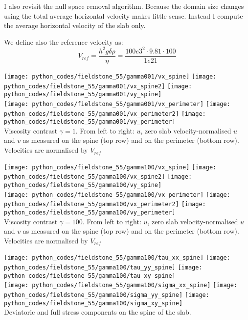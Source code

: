 I also revisit the null space removal algorithm. Because the domain size changes 
using the total average horizontal velocity makes little sense. Instead 
I compute the average horizontal velocity of the slab only. 

We define also the reference velocity as:
\[
V_{ref}= \frac{h^2 g \delta \rho }{\eta} = \frac{100e3^2 \cdot 9.81 \cdot 100}{1e21}
\]

\begin{center}
\texttt{[image: python\_codes/fieldstone\_55/gamma001/vx\_spine]}
\texttt{[image: python\_codes/fieldstone\_55/gamma001/vx\_spine2]}
\texttt{[image: python\_codes/fieldstone\_55/gamma001/vy\_spine]}\\
\texttt{[image: python\_codes/fieldstone\_55/gamma001/vx\_perimeter]}
\texttt{[image: python\_codes/fieldstone\_55/gamma001/vx\_perimeter2]}
\texttt{[image: python\_codes/fieldstone\_55/gamma001/vy\_perimeter]}\\
{\captionfont Viscosity contrast $\gamma=1$. From left to right: $u$, zero slab velocity-normalised $u$ 
and $v$ as measured on the spine (top row) and on the perimeter (bottom row). Velocities are normalised by $V_{ref}$}
\end{center}


\begin{center}
\texttt{[image: python\_codes/fieldstone\_55/gamma100/vx\_spine]}
\texttt{[image: python\_codes/fieldstone\_55/gamma100/vx\_spine2]}
\texttt{[image: python\_codes/fieldstone\_55/gamma100/vy\_spine]}\\
\texttt{[image: python\_codes/fieldstone\_55/gamma100/vx\_perimeter]}
\texttt{[image: python\_codes/fieldstone\_55/gamma100/vx\_perimeter2]}
\texttt{[image: python\_codes/fieldstone\_55/gamma100/vy\_perimeter]}\\
{\captionfont Viscosity contrast $\gamma=100$. From left to right: $u$, zero slab velocity-normalised $u$ 
and $v$ as measured on the spine (top row) and on the perimeter (bottom row). Velocities are normalised by $V_{ref}$}
\end{center}


\begin{center}
\texttt{[image: python\_codes/fieldstone\_55/gamma100/tau\_xx\_spine]}
\texttt{[image: python\_codes/fieldstone\_55/gamma100/tau\_yy\_spine]}
\texttt{[image: python\_codes/fieldstone\_55/gamma100/tau\_xy\_spine]}\\
\texttt{[image: python\_codes/fieldstone\_55/gamma100/sigma\_xx\_spine]}
\texttt{[image: python\_codes/fieldstone\_55/gamma100/sigma\_yy\_spine]}
\texttt{[image: python\_codes/fieldstone\_55/gamma100/sigma\_xy\_spine]}\\
{\captionfont Deviatoric and full stress components on the spine of the slab.}
\end{center}

